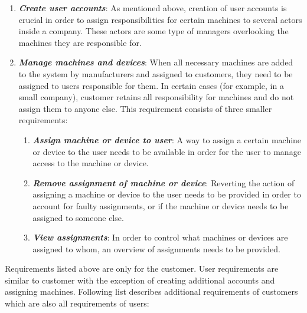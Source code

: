 \begin{enumerate}
	\setlength{\itemsep}{1pt}
	\item \textbf{\textit{Create user accounts}}: As mentioned above, creation of user accounts is crucial in order to assign responsibilities for certain machines to several actors inside a company. These actors are some type of managers overlooking the machines they are responsible for.

	\item \textbf{\textit{Manage machines and devices}}: When all necessary machines are added to the system by manufacturers and assigned to customers, they need to be assigned to users responsible for them. In certain cases (for example, in a small company), customer retains all responsibility for machines and do not assign them to anyone else. This requirement consists of three smaller requirements:
		\begin{enumerate}
			\item \textbf{\textit{Assign machine or device to user}}: A way to assign a certain machine or device to the user needs to be available in order for the user to manage access to the machine or device.
			\item \textbf{\textit{Remove assignment of machine or device}}: Reverting the action of assigning a machine or device to the user needs to be provided in order to account for faulty assignments, or if the machine or device needs to be assigned to someone else.
			\item \textbf{\textit{View assignments}}: In order to control what machines or devices are assigned to whom, an overview of assignments needs to be provided.
		\end{enumerate}
\end{enumerate}

Requirements listed above are only for the customer. User requirements are similar to customer with the exception of creating additional accounts and assigning machines. Following list describes additional requirements of customers which are also all requirements of users:

